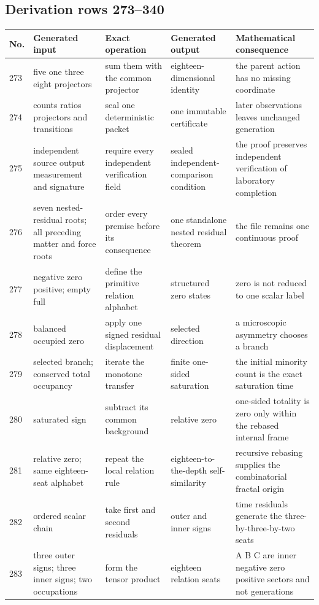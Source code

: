 \documentclass[11pt]{article}
\numberwithin{equation}{section}
\theoremstyle{remark}
\begin{document}
\begin{landscape}
\subsection{Derivation rows 273--340}
\begin{longtable}{p{0.65cm}p{3.5cm}p{4.0cm}p{4.0cm}p{4.6cm}}
\toprule No.&Generated input&Exact operation&Generated output&Mathematical consequence\\\midrule\endhead
273&five one three eight projectors&sum them with the common projector&eighteen-dimensional identity&the parent action has no missing coordinate\\
274&counts ratios projectors and transitions&seal one deterministic packet&one immutable certificate&later observations leaves unchanged generation\\
275&independent source output measurement and signature&require every independent verification field&sealed independent-comparison condition&the proof preserves independent verification of laboratory completion\\
276&seven nested-residual roots; all preceding matter and force roots&order every premise before its consequence&one standalone nested residual theorem&the file remains one continuous proof\\
277&negative zero positive; empty full&define the primitive relation alphabet&structured zero states&zero is not reduced to one scalar label\\
278&balanced occupied zero&apply one signed residual displacement&selected direction&a microscopic asymmetry chooses a branch\\
279&selected branch; conserved total occupancy&iterate the monotone transfer&finite one-sided saturation&the initial minority count is the exact saturation time\\
280&saturated sign&subtract its common background&relative zero&one-sided totality is zero only within the rebased internal frame\\
281&relative zero; same eighteen-seat alphabet&repeat the local relation rule&eighteen-to-the-depth self-similarity&recursive rebasing supplies the combinatorial fractal origin\\
282&ordered scalar chain&take first and second residuals&outer and inner signs&time residuals generate the three-by-three-by-two seats\\
283&three outer signs; three inner signs; two occupations&form the tensor product&eighteen relation seats&A B C are inner negative zero positive sectors and not generations\\

\end{longtable}
\end{landscape}
\end{document}
